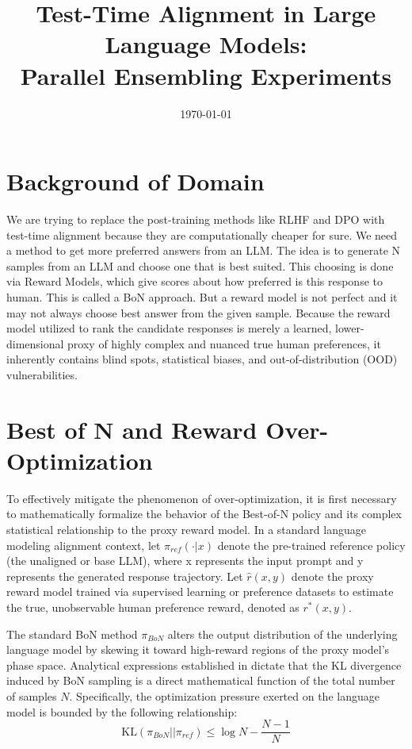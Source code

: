 \documentclass[a4paper,11pt]{article}
\title{\textbf{Test-Time Alignment in Large Language Models:\\Parallel Ensembling Experiments}}
\date{\today}
\begin{document}
\maketitle

\section{Background of Domain}
We are trying to replace the post-training methods like RLHF and DPO with test-time alignment because they are computationally cheaper for sure. We need a method to get more preferred answers from an LLM. The idea is to generate N samples from an LLM and choose one that is best suited. This choosing is done via Reward Models, which give scores about how preferred is this response to human. This is called a BoN approach. But a reward model is not perfect and it may not always choose best answer from the given sample. Because the reward model utilized to rank the candidate responses is merely a learned, lower-dimensional proxy of highly complex and nuanced true human preferences, it inherently contains blind spots, statistical biases, and out-of-distribution (OOD) vulnerabilities.

\section{Best of N and Reward Over-Optimization}
To effectively mitigate the phenomenon of over-optimization, it is first necessary to mathematically formalize the behavior of the Best-of-N policy and its complex statistical relationship to the proxy reward model. In a standard language modeling alignment context, let $\pi_{ref}(\cdot | x)$ denote the pre-trained reference policy (the unaligned or base LLM), where x represents the input prompt and y represents the generated response trajectory. Let $\hat{r}(x, y)$ denote the proxy reward model trained via supervised learning or preference datasets to estimate the true, unobservable human preference reward, denoted as $r^*(x, y)$.

The standard BoN method $\pi_{BoN}$ alters the output distribution of the underlying language model by skewing it toward high-reward regions of the proxy model's phase space. Analytical expressions established in \cite{beirami2024theoretical} dictate that the KL divergence induced by BoN sampling is a direct mathematical function of the total number of samples $N$. Specifically, the optimization pressure exerted on the language model is bounded by the following relationship:
$$ \text{KL}(\pi_{BoN} || \pi_{ref}) \leq \log N - \frac{N - 1}{N} $$
\end{document}
